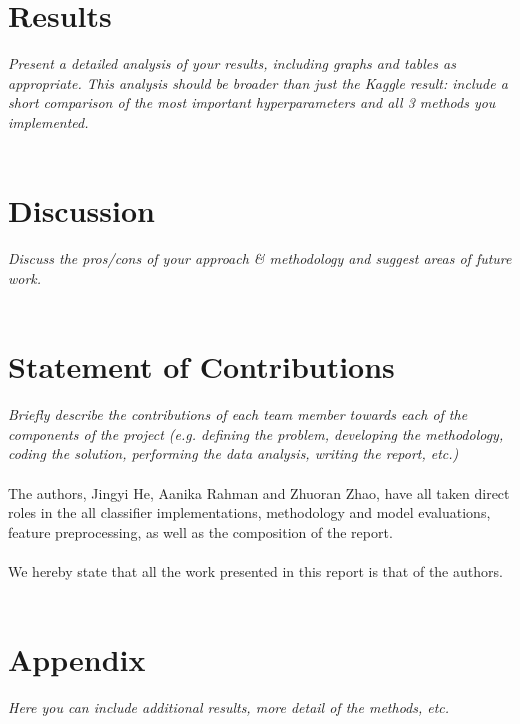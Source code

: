 \documentclass[conference]{IEEEtran}
\begin{document}
\section{Results}
\emph{Present a detailed analysis of your results, including graphs and tables as appropriate. This analysis should be broader than just the Kaggle result: include a short comparison of the most important hyperparameters and all 3 methods you implemented.}
\\
\\

\section{Discussion} 
\emph{Discuss the pros/cons of your approach \& methodology and suggest areas of future work.}
\\
\\

\section{Statement of Contributions} \emph{Briefly describe the contributions of each team member towards each of the components of the project (e.g. defining the problem, developing the methodology, coding the solution, performing the data analysis, writing the report, etc.)}
\\
\\ The authors, Jingyi He, Aanika Rahman and Zhuoran Zhao, have all taken direct roles in the all classifier implementations, methodology and model evaluations, feature preprocessing, as well as the composition of the report. 
\\
\\ We hereby state that all the work presented in this report is that of the authors.
\\
\\

\section*{Appendix} 
\emph{Here you can include additional results, more detail of the methods, etc.}
\\
\\



\end{document}
